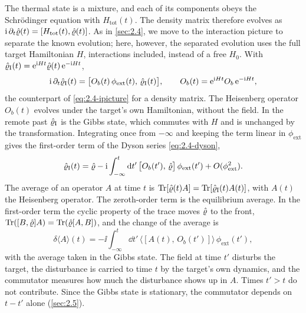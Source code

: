 The thermal state is a mixture, and each of its components obeys the Schr\"odinger equation with $H_{\mathrm{tot}}(t)$. The density matrix therefore evolves as $\mathrm{i}\,\partial_t\hat{\varrho}(t) = [H_{\mathrm{tot}}(t), \hat{\varrho}(t)]$. As in \cref{sec:2.4}, we move to the interaction picture to separate the known evolution; here, however, the separated evolution uses the full target Hamiltonian $H$, interactions included, instead of a free $H_0$. With $\hat{\varrho}_{\mathrm{I}}(t) = \mathrm{e}^{\mathrm{i} Ht}\hat{\varrho}(t)\,\mathrm{e}^{-\mathrm{i} Ht}$,
\begin{equation*}
  \mathrm{i}\,\partial_t\hat{\varrho}_{\mathrm{I}}(t) = \bigl[O_b(t)\,\phi_{\mathrm{ext}}(t),\,\hat{\varrho}_{\mathrm{I}}(t)\bigr], \qquad O_b(t) = \mathrm{e}^{\mathrm{i} Ht}O_b\,\mathrm{e}^{-\mathrm{i} Ht} ,
\end{equation*}
the counterpart of \cref{eq:2.4-ipicture} for a density matrix. The Heisenberg operator $O_b(t)$ evolves under the target's own Hamiltonian, without the field. In the remote past $\hat{\varrho}_{\mathrm{I}}$ is the Gibbs state, which commutes with $H$ and is unchanged by the transformation. Integrating once from $-\infty$ and keeping the term linear in $\phi_{\mathrm{ext}}$ gives the first-order term of the Dyson series \cref{eq:2.4-dyson},
\begin{equation*}
  \hat{\varrho}_{\mathrm{I}}(t) = \hat{\varrho} - \mathrm{i}\int_{-\infty}^{t}\mathrm{d} t'\,\bigl[O_b(t'),\,\hat{\varrho}\bigr]\,\phi_{\mathrm{ext}}(t') + O(\phi_{\mathrm{ext}}^2) .
\end{equation*}
The average of an operator $A$ at time $t$ is $\operatorname{Tr}[\hat{\varrho}(t)A] = \operatorname{Tr}[\hat{\varrho}_{\mathrm{I}}(t)A(t)]$, with $A(t)$ the Heisenberg operator. The zeroth-order term is the equilibrium average. In the first-order term the cyclic property of the trace moves $\hat{\varrho}$ to the front, $\operatorname{Tr}([B, \hat{\varrho}]A) = \operatorname{Tr}(\hat{\varrho}[A, B])$, and the change of the average is
\begin{equation}
  \delta\langle A\rangle(t) = -\ii\int_{-\infty}^{t}\dd t'\,\bigl\langle[A(t),\,O_b(t')]\bigr\rangle\,\phi_{\mathrm{ext}}(t') ,
  \label{eq:4.1-general}
\end{equation}
with the average taken in the Gibbs state. The field at time $t'$ disturbs the target, the disturbance is carried to time $t$ by the target's own dynamics, and the commutator measures how much the disturbance shows up in $A$. Times $t' > t$ do not contribute. Since the Gibbs state is stationary, the commutator depends on $t - t'$ alone (\cref{sec:2.5}).

